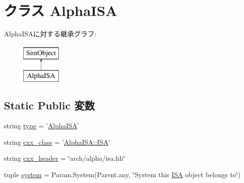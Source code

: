 \hypertarget{classAlphaISA_1_1AlphaISA}{
\section{クラス AlphaISA}
\label{classAlphaISA_1_1AlphaISA}
}
AlphaISAに対する継承グラフ:\begin{figure}[H]
\begin{center}
\leavevmode
\includegraphics[height=2cm]{classAlphaISA_1_1AlphaISA}
\end{center}
\end{figure}
\subsection*{Static Public 変数}
\begin{DoxyCompactItemize}
\item 
string \hyperlink{classAlphaISA_1_1AlphaISA_acce15679d830831b0bbe8ebc2a60b2ca}{type} = '\hyperlink{classAlphaISA_1_1AlphaISA}{AlphaISA}'
\item 
string \hyperlink{classAlphaISA_1_1AlphaISA_a58cd55cd4023648e138237cfc0822ae3}{cxx\_\-class} = '\hyperlink{classAlphaISA_1_1ISA}{AlphaISA::ISA}'
\item 
string \hyperlink{classAlphaISA_1_1AlphaISA_a17da7064bc5c518791f0c891eff05fda}{cxx\_\-header} = \char`\"{}arch/alpha/isa.hh\char`\"{}
\item 
tuple \hyperlink{classAlphaISA_1_1AlphaISA_ab737471139f5a296e5b26e8a0e1b0744}{system} = Param.System(Parent.any, \char`\"{}System this \hyperlink{classAlphaISA_1_1ISA}{ISA} object belongs to\char`\"{})
\end{DoxyCompactItemize}


